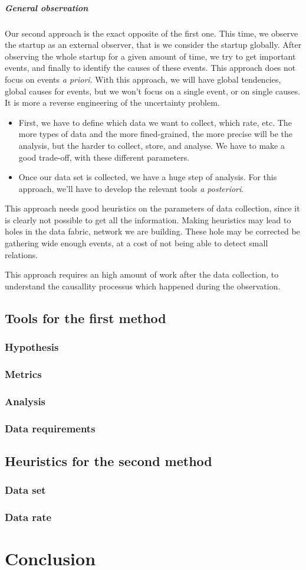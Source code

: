 \documentclass[twoside]{report}
\begin{document}
\paragraph{General observation}Our second approach is the exact opposite of the first one. This time, we observe the startup as an external observer, that is we consider the startup globally. After observing the whole startup for a given amount of time, we try to get important events, and finally to identify the causes of these events. This approach does not focus on events \emph{a priori}. With this approach, we will have global tendencies, global causes for events, but we won't focus on a single event, or on single causes. It is more a reverse engineering of the uncertainty problem. 
\begin{itemize}
	\item First, we have to define which data we want to collect, which rate, etc. The more types of data and the more fined-grained, the more precise will be the analysis, but the harder to collect, store, and analyse. We have to make a good trade-off, with these different parameters.
	\item Once our data set is collected, we have a huge step of analysis. For this approach, we'll have to develop the relevant tools \emph{a posteriori}. 
\end{itemize}
This approach needs good heuristics on the parameters of data collection, since it is clearly not possible to get all the information. Making heuristics may lead to holes in the data fabric, network we are building. These hole may be corrected be gathering wide enough events, at a cost of not being able to detect small relations.

This approach requires an high amount of work after the data collection, to understand the causallity processus which happened during the observation.
\section{Tools for the first method}
\subsection{Hypothesis}
\subsection{Metrics}
\subsection{Analysis}
\subsection{Data requirements}

\section{Heuristics for the second method}
\subsection{Data set}
\subsection{Data rate}
\chapter{Conclusion}
\appendix
\end{document}
